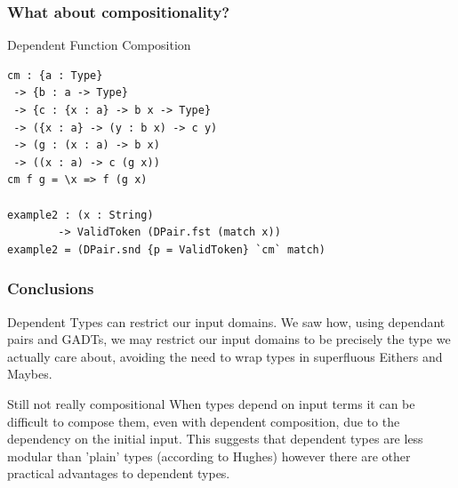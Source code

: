 \documentclass
  [hyperref={colorlinks = true,linkcolor = blue, 
             citecolor = blue, urlcolor = blue}
  ]{beamer}
\begin{document}
\begin{frame}[fragile]
\frametitle{What about compositionality?}
\begin{block}{Dependent Function Composition}
\begin{verbatim}
cm : {a : Type} 
 -> {b : a -> Type}
 -> {c : {x : a} -> b x -> Type}
 -> ({x : a} -> (y : b x) -> c y)
 -> (g : (x : a) -> b x)
 -> ((x : a) -> c (g x))
cm f g = \x => f (g x)

example2 : (x : String) 
        -> ValidToken (DPair.fst (match x))
example2 = (DPair.snd {p = ValidToken} `cm` match)
\end{verbatim}
\end{block}
\end{frame}

\begin{frame}[fragile]
\frametitle{Conclusions}
\begin{block}{Dependent Types can restrict our input domains.}
We saw how, using dependant pairs and GADTs, we may restrict
our input domains to be precisely the type we actually care
about, avoiding the need to wrap types in superfluous Eithers
and Maybes.
\end{block}
\begin{block}{Still not really compositional}
When types depend on input terms it can be difficult to
compose them, even with dependent composition, due to the
dependency on the initial input. This suggests that dependent
types are less modular than 'plain' types (according to
Hughes) however there are other practical advantages to
dependent types.
\end{block}
\end{frame}
\end{document}

